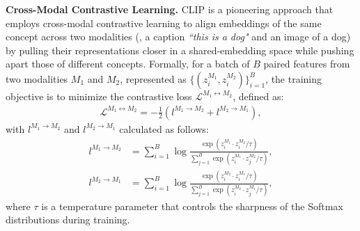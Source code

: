 \vspace{1mm} \noindent\textbf{Cross-Modal Contrastive Learning.}
\label{subsec:contrastive_learning}
CLIP \cite{2dclip} is a pioneering approach that employs cross-modal contrastive learning to align embeddings of the same concept across two modalities (\eg, a caption \textit{``this is a dog"} and an image of a dog) by pulling their representations closer in a shared-embedding space while pushing apart those of different concepts. Formally, for a batch of $B$ paired features from two modalities $M_1$ and $M_2$, represented as $\{(z_{i}^{M_1}, z_{i}^{M_2})\}_{i=1}^{B}$, the training objective is to minimize the contrastive loss $\mathcal{L}^{M_1 \leftrightarrow M_2}$, defined as: 
\begin{equation}
\label{eq:contrastive_loss}
\begin{aligned}
\mathcal{L}^{M_1 \leftrightarrow M_2} = -\frac{1}{2}(l^{M_1 \rightarrow M_2} + l^{M_2 \rightarrow M_1}),
\end{aligned}
\end{equation}
with $l^{M_1 \rightarrow M_2}$ and $l^{M_2 \rightarrow M_1}$ calculated as follows:
\begin{equation}
\begin{aligned}
    l^{M_1 \rightarrow M_2} &= \sum_{i=1}^{B} \log \frac{\exp(z_i^{M_1} \cdot z_i^{M_2} / \tau)}{\sum_{j=1}^{B} \exp(z_i^{M_1} \cdot z_j^{M_2} / \tau)}, \\ 
    l^{M_2 \rightarrow M_1} &= \sum_{i=1}^{B} \log \frac{\exp(z_i^{M_2} \cdot z_i^{M_1} / \tau)}{\sum_{j=1}^{B} \exp(z_i^{M_2} \cdot z_j^{M_1} / \tau)},    
\end{aligned}
\label{eq:component_loss}
\end{equation}
where \( \tau \) is a temperature parameter that controls the sharpness of the Softmax distributions during training.
